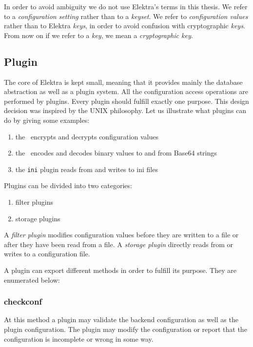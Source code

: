 In order to avoid ambiguity we do not use Elektra's terms in this thesis.
We refer to a \emph{configuration setting} rather than to a \emph{keyset}.
We refer to \emph{configuration values} rather than to Elektra \emph{keys}, in order to avoid confusion with cryptographic \emph{keys}.
From now on if we refer to a \emph{key}, we mean a \emph{cryptographic key}.

\subsection{Plugin}\label{impl_elektra_plugin}

The core of Elektra is kept small, meaning that it provides mainly the database abstraction as well as a plugin system.
All the configuration access operations are performed by plugins.\cite{raab2010thesis}
Every plugin should fulfill exactly one purpose.
This design decision was inspired by the UNIX philosophy.
Let us illustrate what plugins can do by giving some examples:
\begin{enumerate}
\item the \crypto ~encrypts and decrypts configuration values
\item the \base ~encodes and decodes binary values to and from Base64 strings
\item the \texttt{ini} plugin reads from and writes to ini files
\end{enumerate}

Plugins can be divided into two categories:
\begin{enumerate}
\item filter plugins
\item storage plugins
\end{enumerate}

A \emph{filter plugin} modifies configuration values before they are written to a file or after they have been read from a file.
A \emph{storage plugin} directly reads from or writes to a configuration file.

A plugin can export different methods in order to fulfill its purpose.
They are enumerated below:

\subsubsection{checkconf}\label{impl-method-checkconf}

At this method a plugin may validate the backend configuration as well as
the plugin configuration. The plugin may modify the configuration or
report that the configuration is incomplete or wrong in some way.

